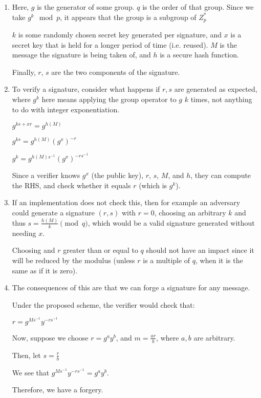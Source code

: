 


\begin{enumerate}[label=(\alph*)]

  \item
    Here, $g$ is the generator of some group. $q$ is the order of that group. Since we take $g^k \mod p$, it appears that the group is a subgroup of $Z^*_p$

    $k$ is some randomly chosen secret key generated per signature, and $x$ is a secret key that is held for a longer period of time (i.e. reused). $M$ is the message the signature is being taken of, and $h$ is a secure hash function.

    Finally, $r$, $s$ are the two components of the signature.

    \item
      To verify a signature, consider what happens if $r,s$ are generated as expected, where $g^k$ here means applying the group operator to $g$ $k$ times, not anything to do with integer exponentiation.

      $g^{ks + xr} = g^{h(M)}$
        
      $g^{ks} = g^{h(M)}(g^{x})^{-r}$

      $g^k = g^{h(M)s^{-1}}(g^x)^{-rs^{-1}}$

      Since a verifier knows $g^x$ (the public key), $r$, $s$, $M$, and $h$, they can compute the RHS, and check whether it equals $r$ (which is $g^k$).

      \item
        If an implementation does not check this, then for example an adversary could generate a signature $(r,s)$ with $r=0$, choosing an arbitrary $k$ and thus $s = \frac{h(M)}{k} \pmod{q}$, which would be a valid signature generated without needing $x$.

        Choosing and $r$ greater than or equal to $q$ should not have an impact since it will be reduced by the modulus (unless $r$ is a multiple of $q$, when it is the same as if it is zero).

        \item
          The consequences of this are that we can forge a signature for any message.

          Under the proposed scheme, the verifier would check that:

          $r = g^{Ms^{-1}}y^{-rs^{-1}}$

          Now, suppose we choose $r = g^ay^b$, and $m = \frac{ar}{b}$, where $a,b$ are arbitrary.

          Then, let $s = \frac{r}{b}$

          We see that $g^{Ms^{-1}}y^{-rs^{-1}} = g^{a}y^{b}$.

          Therefore, we have a forgery.


    \end{enumerate}

